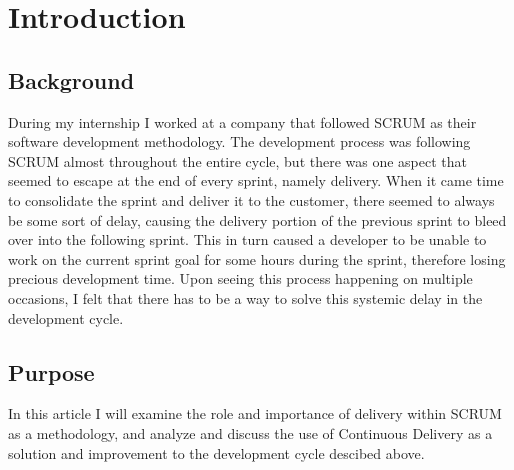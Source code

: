 \section{Introduction}
  \subsection{Background}
    During my internship I worked at a company that followed SCRUM as their software development methodology. The development process was following SCRUM almost throughout the entire cycle, but there was one aspect that seemed to escape at the end of every sprint, namely delivery. When it came time to consolidate the sprint and deliver it to the customer, there seemed to always be some sort of delay, causing the delivery portion of the previous sprint to bleed over into the following sprint. This in turn caused a developer to be unable to work on the current sprint goal for some hours during the sprint, therefore losing precious development time. Upon seeing this process happening on multiple occasions, I felt that there has to be a way to solve this systemic delay in the development cycle.

  \subsection{Purpose}
    In this article I will examine the role and importance of delivery within SCRUM as a methodology, and analyze and discuss the use of Continuous Delivery as a solution and improvement to the development cycle descibed above.